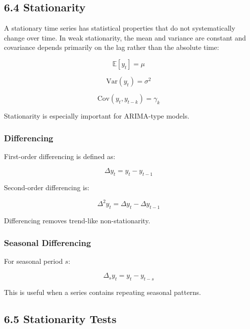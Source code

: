 \documentclass[
  10pt,
  letterpaper,
]{article}
\begin{document}
\hypertarget{stationarity}{%
\subsection{6.4 Stationarity}\label{stationarity}}

A stationary time series has statistical properties that do not systematically
change over time. In weak stationarity, the mean and variance are constant
and covariance depends primarily on the lag rather than the absolute time:

\[
\mathbb{E}[y_t] = \mu
\]

\[
\text{Var}(y_t) = \sigma^2
\]

\[
\text{Cov}(y_t,y_{t-k}) = \gamma_k
\]

Stationarity is especially important for ARIMA-type models.

\hypertarget{differencing}{%
\subsubsection{Differencing}\label{differencing}}

First-order differencing is defined as:

\[
\Delta y_t = y_t-y_{t-1}
\]

Second-order differencing is:

\[
\Delta^2 y_t = \Delta y_t-\Delta y_{t-1}
\]

Differencing removes trend-like non-stationarity.

\hypertarget{seasonal-differencing}{%
\subsubsection{Seasonal Differencing}\label{seasonal-differencing}}

For seasonal period $s$:

\[
\Delta_s y_t = y_t-y_{t-s}
\]

This is useful when a series contains repeating seasonal patterns.

\hypertarget{stationarity-tests}{%
\subsection{6.5 Stationarity Tests}\label{stationarity-tests}}
\end{document}
